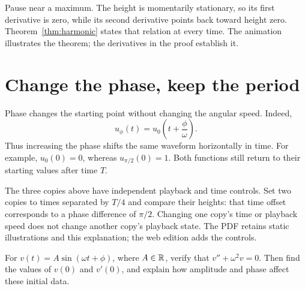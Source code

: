 \documentclass[11pt]{article}
\begin{document}

Pause near a maximum. The height is momentarily stationary, so its first
derivative is zero, while its second derivative points back toward height
zero. Theorem~\ref{thm:harmonic} states that relation at every time. The
animation illustrates the theorem; the derivatives in the proof establish it.

\section{Change the phase, keep the period}
Phase changes the starting point without changing the angular speed.
Indeed,
\[
  u_\phi(t)=u_0\!\left(t+\frac{\phi}{\omega}\right).
\]
Thus increasing the phase shifts the same waveform horizontally in time.
For example, $u_0(0)=0$, whereas $u_{\pi/2}(0)=1$. Both functions still
return to their starting values after time $T$.


The three copies above have independent playback and time controls. Set two
copies to times separated by $T/4$ and compare their heights: that time offset
corresponds to a phase difference of $\pi/2$. Changing one copy's time or
playback speed does not change another copy's playback state.
The PDF retains static illustrations and this explanation; the web edition
adds the controls.

\begin{exercise}
For $v(t)=A\sin(\omega t+\phi)$, where $A\in\mathbb{R}$, verify that
$v''+\omega^2v=0$. Then find the values of $v(0)$ and $v'(0)$, and explain
how amplitude and phase affect these initial data.
\end{exercise}
\end{document}
